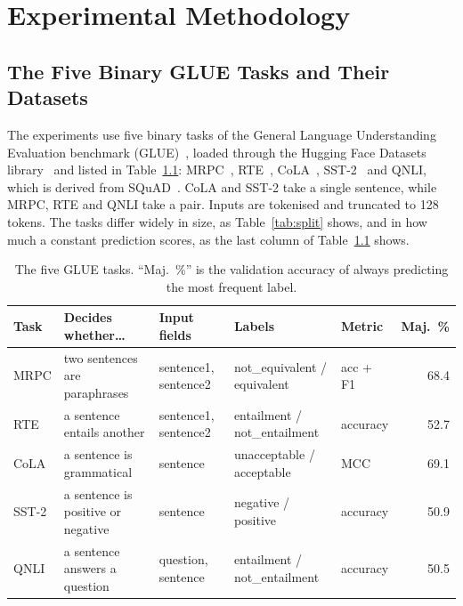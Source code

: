 \chapter{Experimental Methodology}
\label{ch:method}

\section{The Five Binary GLUE Tasks and Their Datasets}

The experiments use five binary tasks of the General Language Understanding Evaluation benchmark (GLUE)~\cite{wang2019glue}, loaded through the Hugging Face Datasets library~\cite{lhoest2021datasets} and listed in Table~\ref{tab:data}: MRPC~\cite{dolan2005mrpc}, RTE~\cite{dagan2006rte}, CoLA~\cite{warstadt2019cola}, SST-2~\cite{socher2013sst} and QNLI, which is derived from SQuAD~\cite{rajpurkar2016squad}. CoLA and SST-2 take a single sentence, while MRPC, RTE and QNLI take a pair. Inputs are tokenised and truncated to 128 tokens. The tasks differ widely in size, as Table~\ref{tab:split} shows, and in how much a constant prediction scores, as the last column of Table~\ref{tab:data} shows.

\begin{table}[htbp]
  \centering\tablestyle
  \caption{The five GLUE tasks. ``Maj.\ \%'' is the validation accuracy of always predicting the most frequent label.}
  \label{tab:data}
  \setlength{\tabcolsep}{3.5pt}\begin{tabularx}{\linewidth}{l X l l l r}
    \toprule
    Task & Decides whether\ldots & Input fields & Labels & Metric & Maj.\ \%\\
    \midrule
    MRPC & two sentences are paraphrases & sentence1, sentence2 & not\_equivalent / equivalent & acc + F1 & 68.4\\
    RTE & a sentence entails another & sentence1, sentence2 & entailment / not\_entailment & accuracy & 52.7\\
    CoLA & a sentence is grammatical & sentence & unacceptable / acceptable & MCC & 69.1\\
    SST-2 & a sentence is positive or negative & sentence & negative / positive & accuracy & 50.9\\
    QNLI & a sentence answers a question & question, sentence & entailment / not\_entailment & accuracy & 50.5\\
    \bottomrule
  \end{tabularx}
\end{table}

